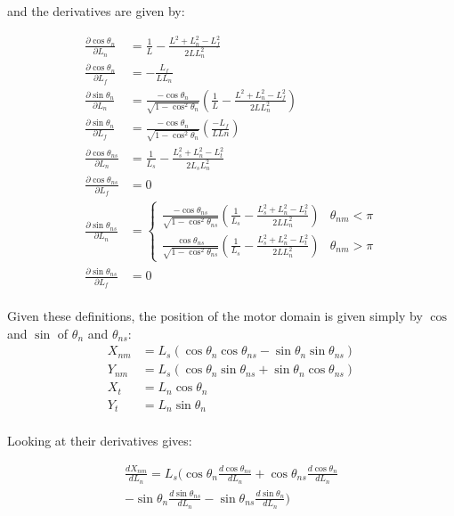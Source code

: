 \documentclass[11pt,twocolumn]{article}
\begin{document}
and the derivatives are given by:

\begin{align}
  \frac{\partial \cos\theta_n}{\partial L_n} &= \frac{1}{L} - \frac{L^2 + L_n^2 - L_f^2}{2L L_n^2}\\
  \frac{\partial \cos\theta_n}{\partial L_f} &= -\frac{L_f}{LL_n}\\
  \frac{\partial \sin\theta_n}{\partial L_n} &= \frac{-\cos\theta_n}{\sqrt{1-\cos^2\theta_n}}
  \left(\frac{1}{L} - \frac{L^2 + L_n^2 - L_f^2}{2L L_n^2}\right)\\
  \frac{\partial \sin\theta_n}{\partial L_f} &= \frac{-\cos\theta_n}{\sqrt{1-\cos^2\theta_n}}
  \left(\frac{-L_f}{LLn}\right)\\
  \frac{\partial \cos\theta_{ns}}{\partial L_n} &= \frac{1}{L_s}
  - \frac{L_s^2 + L_n^2 - L_t^2}{2L_sL_n^2}\\
  \frac{\partial \cos\theta_{ns}}{\partial L_f} &= 0\\
  \frac{\partial \sin\theta_{ns}}{\partial L_n} &=
  \begin{cases}
    \frac{-\cos\theta_{ns}}{\sqrt{1-\cos^2\theta_{ns}}}
    \left(\frac{1}{L_s} - \frac{L_s^2+L_n^2-L_t^2}{2LL_n^2}\right) & \theta_{nm} < \pi \\
    \frac{\cos\theta_{ns}}{\sqrt{1-\cos^2\theta_{ns}}}
    \left(\frac{1}{L_s} - \frac{L_s^2+L_n^2-L_t^2}{2LL_n^2}\right) & \theta_{nm} > \pi
  \end{cases}\\
  \frac{\partial \sin\theta_{ns}}{\partial L_f} &= 0\\
\end{align}

Given these definitions, the position of the motor domain is given
simply by $\cos$ and $\sin$ of $\theta_n$ and $\theta_{ns}$:
\begin{align}
  X_{nm} &= L_s\left(
  \cos\theta_n\cos\theta_{ns} - \sin\theta_n\sin\theta_{ns}
  \right)
  \\
  Y_{nm} &= L_s\left(
  \cos\theta_n\sin\theta_{ns} + \sin\theta_n\cos\theta_{ns}
  \right)
  \\
  X_{t} &= L_n\cos\theta_n\\
  Y_{t} &= L_n\sin\theta_n\\
\end{align}

Looking at their derivatives gives:

\begin{multline}
  \frac{dX_{nm}}{dL_n} = L_s\Big(
  \cos\theta_n\frac{d\cos\theta_{ns}}{dL_n}
  + \cos\theta_{ns}\frac{d\cos\theta_{n}}{dL_n} \\
  - \sin\theta_n\frac{d\sin\theta_{ns}}{dL_n}
  - \sin\theta_{ns}\frac{d\sin\theta_{n}}{dL_n}
  \Big)\\
\end{multline}
\end{document}
